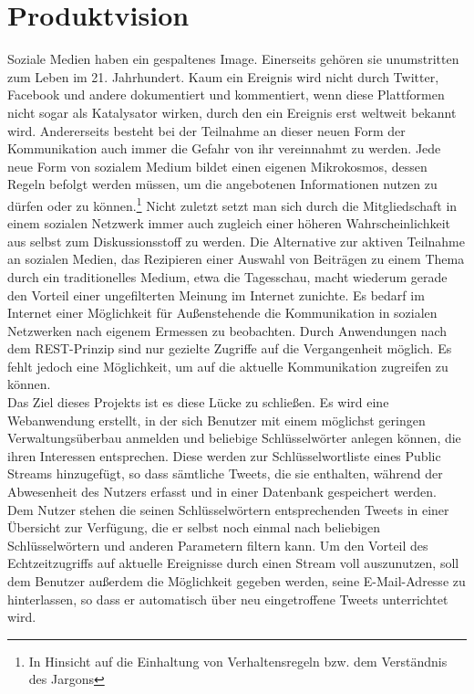 \section{Produktvision}
%
Soziale Medien haben ein gespaltenes Image. Einerseits gehören sie unumstritten zum Leben im 21. Jahrhundert. Kaum ein Ereignis wird nicht durch Twitter, Facebook und andere dokumentiert und kommentiert, wenn diese Plattformen nicht sogar als Katalysator wirken, durch den ein Ereignis erst weltweit bekannt wird. Andererseits besteht bei der Teilnahme an dieser neuen Form der Kommunikation auch immer die Gefahr von ihr vereinnahmt zu werden. Jede neue Form von sozialem Medium bildet einen eigenen Mikrokosmos, dessen Regeln befolgt werden müssen, um die angebotenen Informationen nutzen zu dürfen oder zu können.\footnote{In Hinsicht auf die Einhaltung von Verhaltensregeln bzw. dem Verständnis des Jargons} Nicht zuletzt setzt man sich durch die Mitgliedschaft in einem sozialen Netzwerk immer auch zugleich einer höheren Wahrscheinlichkeit aus selbst zum Diskussionsstoff zu werden. Die Alternative zur aktiven Teilnahme an sozialen Medien, das Rezipieren einer Auswahl von Beiträgen zu einem Thema durch ein traditionelles Medium, etwa die Tagesschau, macht wiederum gerade den Vorteil einer ungefilterten Meinung im Internet zunichte. Es bedarf im Internet einer Möglichkeit für Außenstehende die Kommunikation in sozialen Netzwerken nach eigenem Ermessen zu beobachten. Durch Anwendungen nach dem REST-Prinzip sind nur gezielte Zugriffe auf die Vergangenheit möglich. Es fehlt jedoch eine Möglichkeit, um auf die aktuelle Kommunikation zugreifen zu können. \\
Das Ziel dieses Projekts ist es diese Lücke zu schließen. Es wird eine Webanwendung erstellt, in der sich Benutzer mit einem möglichst geringen Verwaltungsüberbau anmelden und beliebige Schlüsselwörter anlegen können, die ihren Interessen entsprechen. Diese werden zur Schlüsselwortliste eines Public Streams hinzugefügt, so dass sämtliche Tweets, die sie enthalten, während der Abwesenheit des Nutzers erfasst und in einer Datenbank gespeichert werden. Dem Nutzer stehen die seinen Schlüsselwörtern entsprechenden Tweets in einer Übersicht zur Verfügung, die er selbst noch einmal nach beliebigen Schlüsselwörtern und anderen Parametern filtern kann. Um den Vorteil des Echtzeitzugriffs auf aktuelle Ereignisse durch einen Stream voll auszunutzen, soll dem Benutzer außerdem die Möglichkeit gegeben werden, seine E-Mail-Adresse zu hinterlassen, so dass er automatisch über neu eingetroffene Tweets unterrichtet wird.

